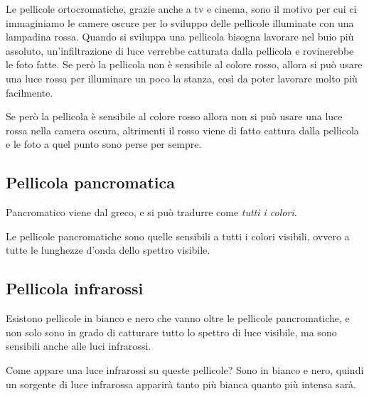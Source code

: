 Le pellicole ortocromatiche, grazie anche a tv e cinema, sono il motivo per cui ci immaginiamo le camere oscure per lo sviluppo delle pellicole illuminate con una lampadina rossa.
Quando si sviluppa una pellicola bisogna lavorare nel buio più assoluto, un'infiltrazione di luce verrebbe catturata dalla pellicola e rovinerebbe le foto fatte.
Se però la pellicola  non è sensibile al colore rosso, allora si può usare una luce rossa per illuminare un poco la stanza, così da poter lavorare molto più facilmente.

Se però la pellicola è sensibile al colore rosso allora non si può usare una luce rossa nella camera oscura, altrimenti il rosso viene di fatto cattura dalla pellicola e le foto a quel punto sono perse per sempre.


\subsection{Pellicola pancromatica} \label{subsec:pellicolapan}
Pancromatico viene dal greco, e si può tradurre come \textit{tutti i colori}.

Le pellicole pancromatiche sono quelle sensibili a tutti i colori visibili, ovvero a tutte le lunghezze d'onda dello spettro visibile.


\subsection{Pellicola infrarossi} \label{subsec:pellicolair}
Esistono pellicole in bianco e nero che vanno oltre le pellicole pancromatiche, e non solo sono in grado di catturare tutto lo spettro di luce visibile, ma sono sensibili anche alle luci infrarossi.

Come appare una luce infrarossi su queste pellicole? Sono in bianco e nero, quindi un sorgente di luce infrarossa apparirà tanto più bianca quanto più intensa sarà.